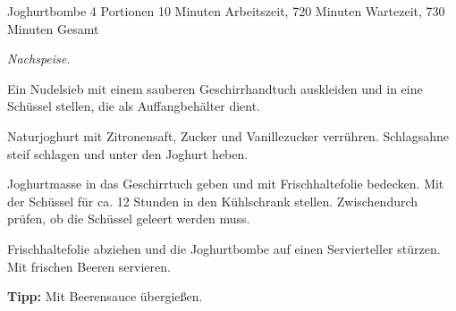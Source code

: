 \begin{recipe}{Joghurtbombe} {4 Portionen} {10 Minuten Arbeitszeit, 720 Minuten Wartezeit, 730 Minuten Gesamt}

  \freeform
  \textit{Nachspeise.}


  Ein Nudelsieb mit einem sauberen Geschirrhandtuch auskleiden und in eine Schüssel stellen, die als Auffangbehälter dient.

  \newstep
  Naturjoghurt mit Zitronensaft, Zucker und Vanillezucker verrühren.
  Schlagsahne steif schlagen und unter den Joghurt heben.

  \newstep
  Joghurtmasse in das Geschirrtuch geben und mit Frischhaltefolie bedecken.
  Mit der Schüssel für ca. 12 Stunden in den Kühlschrank stellen.
  Zwischendurch prüfen, ob die Schüssel geleert werden muss.

  \newstep
  Frischhaltefolie abziehen und die Joghurtbombe auf einen Servierteller stürzen.
  Mit frischen Beeren servieren.

  \freeform
  \hrulefill

  \freeform
  \textbf{Tipp:}
  Mit Beerensauce übergießen.

  \end{recipe}
